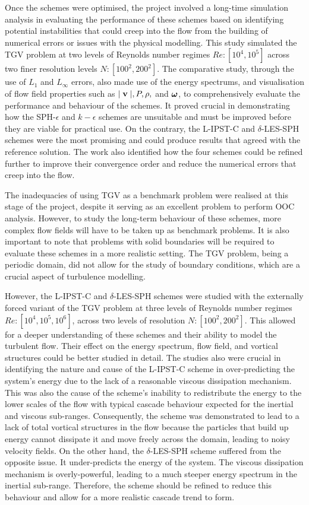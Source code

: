 Once the schemes were optimised, the project involved a long-time simulation analysis in evaluating the performance of these schemes based on identifying potential instabilities that could creep into the flow from the building of numerical errors or issues with the physical modelling. This study simulated the TGV problem at two levels of Reynolds number regimes $Re: [10^4, 10^5]$ across two finer resolution levels $N: [100^2, 200^2]$.
The comparative study, through the use of $L_1$ and $L_{\infty}$ errors, also made use of the energy spectrums, and visualisation of flow field properties such as $\mid \mathbf{v} \mid, P, \rho,$ and  $\bm{\omega}$, to comprehensively evaluate the performance and behaviour of the schemes.
It proved crucial in demonstrating how the SPH-$\epsilon$ and $k-\epsilon$ schemes are unsuitable and must be improved before they are viable for practical use. 
On the contrary, the L-IPST-C and $\delta$-LES-SPH schemes were the most promising and could produce results that agreed with the reference solution.
The work also identified how the four schemes could be refined further to improve their convergence order and reduce the numerical errors that creep into the flow.

The inadequacies of using TGV as a benchmark problem were realised at this stage of the project, despite it serving as an excellent problem to perform OOC analysis. However,  to study the long-term behaviour of these schemes, more complex flow fields will have to be taken up as benchmark problems. It is also important to note that problems with solid boundaries will be required to evaluate these schemes in a more realistic setting. The TGV problem, being a periodic domain, did not allow for the study of boundary conditions, which are a crucial aspect of turbulence modelling.

However, the L-IPST-C and $\delta$-LES-SPH schemes were studied with the externally forced variant of the TGV problem at three levels of Reynolds number regimes $Re: [10^4, 10^5, 10^6]$, across two levels of resolution $N: [100^2, 200^2]$.
This allowed for a deeper understanding of these schemes and their ability to model the turbulent flow. Their effect on the energy spectrum, flow field, and vortical structures could be better studied in detail.
The studies also were crucial in identifying the nature and cause of the L-IPST-C scheme in over-predicting the system's energy due to the lack of a reasonable viscous dissipation mechanism. This was also the cause of the scheme's inability to redistribute the energy to the lower scales of the flow with typical cascade behaviour expected for the inertial and viscous sub-ranges. Consequently, the scheme was demonstrated to lead to a lack of total vortical structures in the flow because the particles that build up energy cannot dissipate it and move freely across the domain, leading to noisy velocity fields.
On the other hand, the $\delta$-LES-SPH scheme suffered from the opposite issue. It under-predicts the energy of the system. The viscous dissipation mechanism is overly-powerful, leading to a much steeper energy spectrum in the inertial sub-range. Therefore, the scheme should be refined to reduce this behaviour and allow for a more realistic cascade trend to form.

